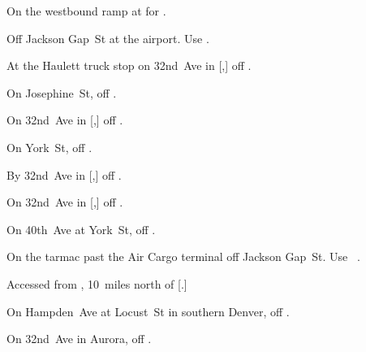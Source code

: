 
\begin{LocationList}

On the westbound ramp at   for .

Off Jackson Gap~St at the airport.
Use  .

At the Haulett truck stop on 32nd~Ave in [,] off  .

\Location{\GarageHQ \Garage}
On Josephine~St, off  .

On 32nd~Ave in [,] off  .

On York~St, off  .

\Location{\RecruitmentAgency \Recruitment}
By 32nd~Ave in [,] off  .

On 32nd~Ave in [,] off  .

On 40th~Ave at York~St, off  .

On the tarmac past the Air Cargo terminal off Jackson Gap~St.
Use~ .

Accessed from , 10~miles north of [.]

On  Hampden~Ave at Locust~St in southern Denver, off  .

On 32nd~Ave in Aurora, off  .

\end{LocationList}
